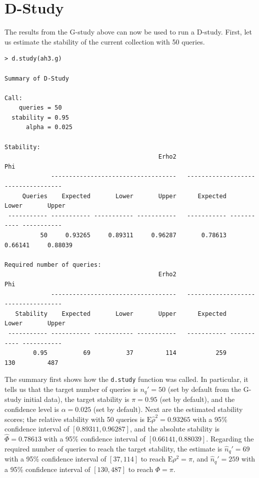 \documentclass[twoside]{article}
\begin{document}
\section{D-Study}

The results from the G-study above can now be used to run a D-study. First, let us estimate the stability of the current collection with 50 queries.

{\small\begin{verbatim}
> d.study(ah3.g)

Summary of D-Study

Call:
    queries = 50 
  stability = 0.95 
      alpha = 0.025 

Stability:
                                           Erho2                                   Phi
             -----------------------------------   -----------------------------------
     Queries    Expected       Lower       Upper      Expected       Lower       Upper
 ----------- ----------- ----------- -----------   ----------- ----------- -----------
          50     0.93265     0.89311     0.96287       0.78613     0.66141     0.88039 

Required number of queries:
                                           Erho2                                   Phi
             -----------------------------------   -----------------------------------
   Stability    Expected       Lower       Upper      Expected       Lower       Upper
 ----------- ----------- ----------- -----------   ----------- ----------- -----------
        0.95          69          37         114           259         130         487
\end{verbatim}}

The summary first shows how the \texttt{d.study} function was called. In particular, it tells us that the target number of queries is $n_q'=50$ (set by default from the G-study initial data), the target stability is $\pi=0.95$ (set by default), and the confidence level is $\alpha=0.025$ (set by default).
Next are the estimated stability scores; the relative stability with 50 queries is $\text{E}\hat\rho^2=0.93265$ with a 95\% confidence interval of $[0.89311, 0.96287]$, and the absolute stability is $\hat\Phi=0.78613$ with a 95\% confidence interval of $[0.66141, 0.88039]$.
Regarding the required number of queries to reach the target stability, the estimate is $\hat{n}_q'=69$ with a 95\% confidence interval of $[37, 114]$ to reach $\text{E}\rho^2=\pi$, and $\hat{n}_q'=259$ with a 95\% confidence interval of $[130, 487]$ to reach $\Phi=\pi$.
\end{document}
